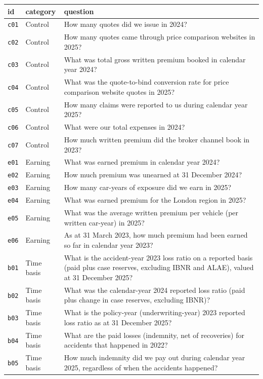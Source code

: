 {\small\begin{longtable}{p{0.6cm}p{2.2cm}p{11.5cm}}\toprule id & category & question \\ \midrule
\texttt{c01} & Control & How many quotes did we issue in 2024? \\
\texttt{c02} & Control & How many quotes came through price comparison websites in 2025? \\
\texttt{c03} & Control & What was total gross written premium booked in calendar year 2024? \\
\texttt{c04} & Control & What was the quote-to-bind conversion rate for price comparison website quotes in 2025? \\
\texttt{c05} & Control & How many claims were reported to us during calendar year 2025? \\
\texttt{c06} & Control & What were our total expenses in 2024? \\
\texttt{c07} & Control & How much written premium did the broker channel book in 2023? \\
\texttt{e01} & Earning & What was earned premium in calendar year 2024? \\
\texttt{e02} & Earning & How much premium was unearned at 31 December 2024? \\
\texttt{e03} & Earning & How many car-years of exposure did we earn in 2025? \\
\texttt{e04} & Earning & What was earned premium for the London region in 2025? \\
\texttt{e05} & Earning & What was the average written premium per vehicle (per written car-year) in 2025? \\
\texttt{e06} & Earning & As at 31 March 2023, how much premium had been earned so far in calendar year 2023? \\
\texttt{b01} & Time basis & What is the accident-year 2023 loss ratio on a reported basis (paid plus case reserves, excluding IBNR and ALAE), valued at 31 December 2025? \\
\texttt{b02} & Time basis & What was the calendar-year 2024 reported loss ratio (paid plus change in case reserves, excluding IBNR)? \\
\texttt{b03} & Time basis & What is the policy-year (underwriting-year) 2023 reported loss ratio as at 31 December 2025? \\
\texttt{b04} & Time basis & What are the paid losses (indemnity, net of recoveries) for accidents that happened in 2022? \\
\texttt{b05} & Time basis & How much indemnity did we pay out during calendar year 2025, regardless of when the accidents happened? \\

\end{longtable}}
